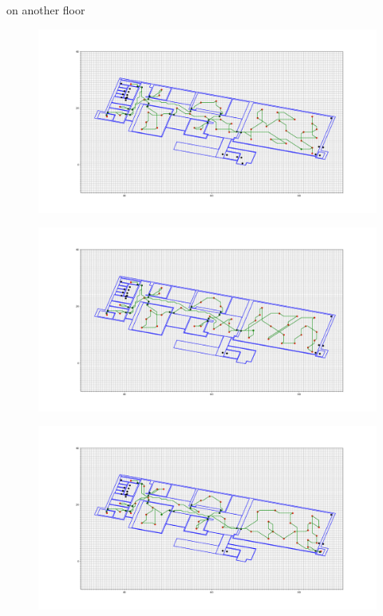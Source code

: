 on another floor
\begin{figure}[H]
    \centering
    \includegraphics[width=1\textwidth]{fig/Resultater/127/5.36_min_height_radius1.png}
    \label{Rum knudepu}
    \caption[Design overview]{}
\end{figure}
\begin{figure}[H]
    \centering
    \includegraphics[width=1\textwidth]{fig/Resultater/127/5.36_min_height_radius0.1.png}
    \label{Rum knudepu}
    \caption[Design overview]{}
\end{figure}
\begin{figure}[H]
    \centering
    \includegraphics[width=1\textwidth]{fig/Resultater/127/5.36_min_height_radius0.01.png}
    \label{Rum knudepu}
    \caption[Design overview]{}
\end{figure}

